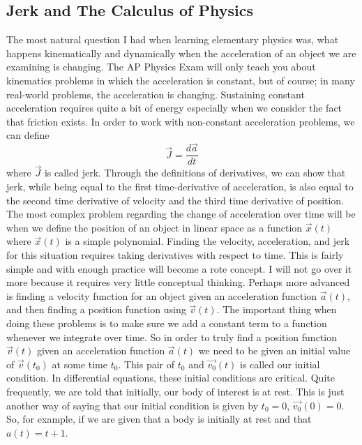 \documentclass{article}[gray]
\numberwithin{equation}{subsection}
\begin{document}
\subsection{Jerk and The Calculus of Physics}
\newline
The most natural question I had when learning elementary physics was, what happens kinematically and dynamically when the acceleration of an object we are examining is changing. The AP Physics Exam will only teach you about kinematics problems in which the acceleration is constant, but of course; in many real-world problems, the acceleration is changing. Sustaining constant acceleration requires quite a bit of energy especially when we consider the fact that friction exists. In order to work with non-constant acceleration problems, we can define \begin{equation}\vec{J}= \frac{d\vec{a}}{dt}\end{equation} where $\vec{J}$ is called jerk. Through the definitions of derivatives, we can show that jerk, while being equal to the first time-derivative of acceleration, is also equal to the second time derivative of velocity and the third time derivative of position. The most complex problem regarding the change of acceleration over time will be when we define the position of an object in linear space as a function $\vec{x}\left(t\right)$ where $\vec{x}\left(t\right)$ is a simple polynomial. Finding the velocity, acceleration, and jerk for this situation requires taking derivatives with respect to time. This is fairly simple and with enough practice will become a rote concept. I will not go over it more because it requires very little conceptual thinking. Perhaps more advanced is finding a velocity function for an object given an acceleration function $\vec{a}\left(t\right)$, and then finding a position  function using $\vec{v}\left(t\right)$. The important thing when doing these problems is to make sure we add a constant term to a function whenever we integrate over time. So in order to truly find a position function $\vec{v}\left(t\right)$ given an acceleration function $\vec{a}\left(t\right)$ we need to be given an initial value of $\vec{v}\left(t_0\right)$ at some  time $t_0$. This pair of $t_0$ and $\vec{v_0} \left(t\right)$ is called our initial condition. In differential equations, these initial conditions are critical. Quite frequently, we are told that initially, our body of interest is at rest. This is just another way of saying that our initial condition is given by $t_0=0$, $\vec{v_0}\left(0\right)=0$. So, for example, if we are given that a body is initially at rest and that $a\left(t\right)=t+1$. 
\end{document}
